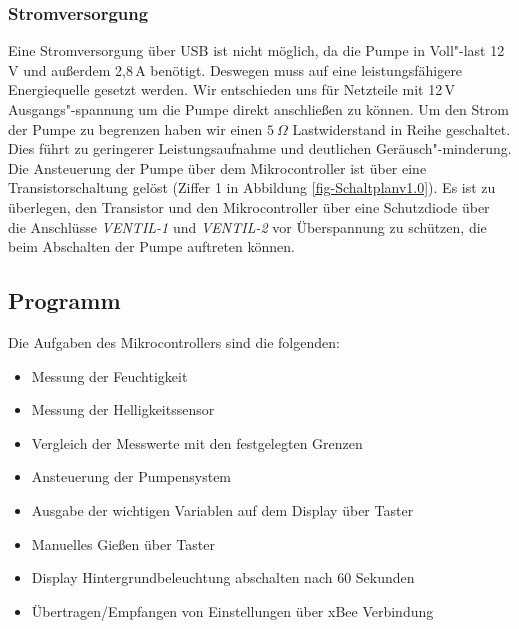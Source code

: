 	
\subsubsection{Stromversorgung}

Eine Stromversorgung über USB ist nicht möglich, da die Pumpe in Voll"-last 12\,V und außerdem 2,8\,A benötigt. 
Deswegen muss auf eine leistungsfähigere Energiequelle gesetzt werden.
Wir entschieden uns für Netzteile mit 12\,V Ausgangs"-spannung um die Pumpe direkt anschließen zu können. 
Um den Strom der Pumpe zu begrenzen haben wir einen \begin{math}5~\Omega\end{math} Lastwiderstand in Reihe geschaltet.
Dies führt zu geringerer Leistungsaufnahme und deutlichen Geräusch"-minderung.
Die Ansteuerung der Pumpe über dem Mikrocontroller ist über eine Transistorschaltung gelöst (Ziffer 1 in Abbildung \ref{fig-Schaltplanv1.0}).
Es ist zu überlegen, den Transistor und den Mikrocontroller über eine Schutzdiode über die Anschlüsse \emph{VENTIL-1} und \emph{VENTIL-2} vor Überspannung zu schützen, die beim Abschalten der Pumpe auftreten können. 
 

\subsection{Programm}
	

	Die Aufgaben des Mikrocontrollers sind die folgenden:
		\begin{itemize}
			\item Messung der Feuchtigkeit
			\item Messung der Helligkeitssensor
			\item Vergleich der Messwerte mit den festgelegten Grenzen
			\item Ansteuerung der Pumpensystem
			\item Ausgabe der wichtigen Variablen auf dem Display über Taster
			\item Manuelles Gießen über Taster
			\item Display Hintergrundbeleuchtung abschalten nach 60  Sekunden
			\item Übertragen/Empfangen von Einstellungen über xBee Verbindung
		\end{itemize}
		
